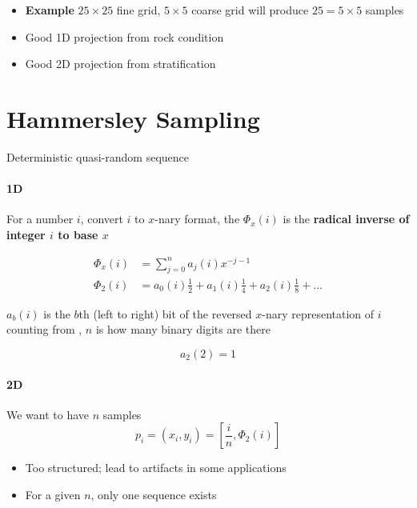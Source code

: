   \begin{itemize}
    \item \textbf{Example} $ 25 \times 25 $ fine grid, $ 5 \times 5 $ coarse grid
    will produce $ 25 = 5 \times 5 $ samples
    \item Good 1D projection from rock condition
    \item Good 2D projection from stratification
  \end{itemize}

\section{Hammersley Sampling}

  Deterministic quasi-random sequence

  \paragraph{1D}
  For a number $ i $, convert $ i $ to $ x $-nary format, the
  $ \Phi_{x} \left( i \right) $ is the \textbf{radical inverse
  of integer $ i $ to base $ x $}

  \begin{align}
    \Phi_{x}\left( i \right)
      &= \sum_{j = 0}^{n} a_{j} \left( i \right) x^{-j - 1} \\
    \Phi_{2}\left( i \right)
      &= a_{0} \left( i \right) \frac{1}{2}
      + a_{1} \left( i \right) \frac{1}{4}
      + a_{2} \left( i \right) \frac{1}{8} + ...
  \end{align}

  $ a_{b}\left( i \right) $ is the $ b $th (left to right) bit of the reversed
  $ x $-nary representation of $ i $ counting from , $ n $ is how many binary
  digits are there

  \begin{displaymath}
    a_{2}\left( 2 \right) = 1
  \end{displaymath}

  \paragraph{2D} We want to have $ n $ samples
  \begin{equation}
    p_{i}
      = \left( x_{i}, y_{i} \right)
      = \left[ \frac{i}{n}, \Phi_{2}\left( i \right) \right]
  \end{equation}

  \begin{itemize}
    \item Too structured; lead to artifacts in some applications
    \item For a given $ n $, only one sequence exists
  \end{itemize}

